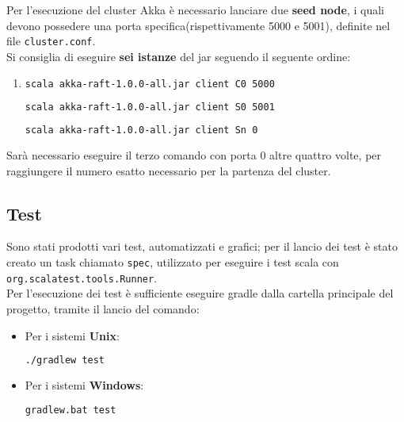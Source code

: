 		Per l'esecuzione del cluster Akka è necessario lanciare due \textbf{seed node}, i quali devono possedere una porta specifica(rispettivamente 5000 e 5001), definite nel file \texttt{cluster.conf}.\\
		Si consiglia di eseguire \textbf{sei istanze} del jar seguendo il seguente ordine:
		  \begin{enumerate}
			  \item
			  	\begin{lstlisting}[language=bash]
scala akka-raft-1.0.0-all.jar client C0 5000
			  	\end{lstlisting}
			  	\begin{lstlisting}[language=bash]
scala akka-raft-1.0.0-all.jar client S0 5001
					\end{lstlisting}
			  	\begin{lstlisting}[language=bash]
scala akka-raft-1.0.0-all.jar client Sn 0
					\end{lstlisting}			  
			\end{enumerate}	
		Sarà necessario eseguire il terzo comando con porta $0$ altre quattro volte, per raggiungere il numero esatto necessario per la partenza del cluster.
 
 \subsection{Test}
 Sono stati prodotti vari test, automatizzati e grafici; per il lancio dei test è stato creato un task chiamato \texttt{spec}, utilizzato per eseguire i test scala con \texttt{org.scalatest.tools.Runner}.\\
	Per l'esecuzione dei test è sufficiente eseguire gradle dalla cartella principale del progetto, tramite il lancio del comando:
	\begin{itemize}
		\item Per i sistemi \textbf{Unix}: 
			\begin{lstlisting}[language=bash]
./gradlew test
			\end{lstlisting}
		\item Per i sistemi \textbf{Windows}: 
			\begin{lstlisting}[language=bash]
gradlew.bat test
			\end{lstlisting}
	\end{itemize}
